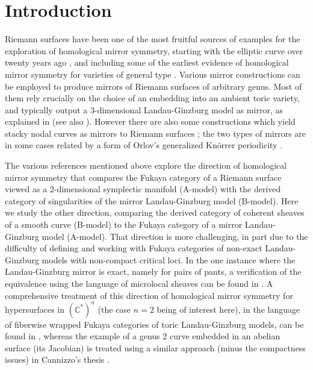 \documentclass[11pt,leqno]{amsart}
\numberwithin{equation}{section}
\def\C{\mathbb{C}}
\begin{document}
\section{Introduction}

Riemann surfaces have been one of the most fruitful sources of examples for
the exploration of homological mirror symmetry, starting with the elliptic curve over
twenty years ago \cite{PZ}, and including some of the
earliest evidence of homological mirror symmetry for varieties of general
type \cite{SeGenus2,EfimovGenusG,AAEKO}. 
Various mirror constructions can be employed to produce mirrors of
Riemann surfaces of arbitrary genus. Most of them rely crucially on the
choice of an embedding into an ambient toric variety, and typically
output a 3-dimensional Landau-Ginzburg model as mirror,
as explained in \cite{AAK} (see also \cite{HoriVafa,Clarke,ChanLauLeung,GKR}).
However there are also some constructions which yield stacky nodal curves 
as mirrors to Riemann surfaces \cite{STZ,GammageShende,LekiliPolishchuk};
the two types of mirrors are in some cases related by a form of Orlov's
generalized Kn\"orrer periodicity \cite{Orlov}.

The various references mentioned above explore the direction of homological mirror
symmetry that compares the Fukaya category of a Riemann surface viewed
as a 2-dimensional symplectic manifold (A-model) with the derived category 
of singularities of the mirror Landau-Ginzburg model (B-model).
Here we study the other direction, comparing the derived category of
coherent sheaves of a smooth curve (B-model) to the Fukaya category of
a mirror Landau-Ginzburg model (A-model). That direction is more challenging, in part
due to the difficulty of defining and working with Fukaya categories of
non-exact Landau-Ginzburg models with non-compact critical loci. 
In the one instance where the
Landau-Ginzburg mirror is exact, namely for pairs of pants, a verification
of the equivalence using the language of microlocal sheaves can be found in \cite{Nadler}.
A comprehensive treatment of this direction of homological mirror symmetry 
for hypersurfaces in $(\C^*)^n$ (the case $n=2$ being of interest here), 
in the language of fiberwise wrapped Fukaya categories of toric 
Landau-Ginzburg models, can be found in \cite{AA}, whereas the example of
a genus 2 curve embedded in an abelian surface (its Jacobian) is treated
using a similar approach (minus the compactness issues)
in Cannizzo's thesis \cite{Cannizzo}. 
\end{document}
